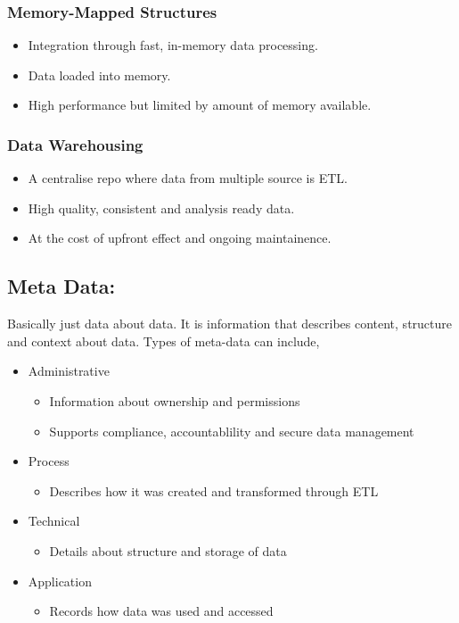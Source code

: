 \documentclass[a5paper]{article}
\begin{document}
	\subsubsection{Memory-Mapped Structures}
	\begin{itemize}
		\item Integration through fast, in-memory data processing.
		\item Data loaded into memory.
		\item High performance but limited by amount of memory available.
	\end{itemize}
	\subsubsection{Data Warehousing}
	\begin{itemize}
		\item A centralise repo where data from multiple source is ETL.
		\item High quality, consistent and analysis ready data.
		\item At the cost of upfront effect and ongoing maintainence.
	\end{itemize}
	\subsection{Meta Data:}
	Basically just data about data. It is information that describes content, structure and context about data. Types of meta-data can include,
	\begin{itemize}
		\item Administrative
			\begin{itemize}
				\item Information about ownership and permissions
				\item Supports compliance, accountablility and secure data management
			\end{itemize}
		\item Process
			\begin{itemize}
				\item Describes how it was created and transformed through ETL
			\end{itemize}
		\item Technical
			\begin{itemize}
				\item Details about structure and storage of data
			\end{itemize}
		\item Application
			\begin{itemize}
				\item Records how data was used and accessed
			\end{itemize}
	\end{itemize}
\end{document}
